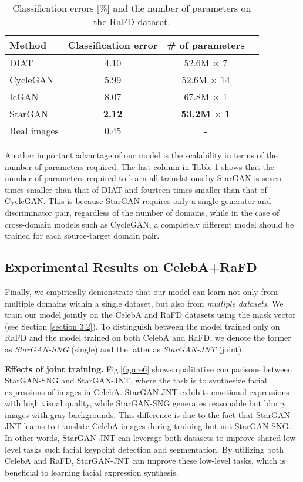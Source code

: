 \documentclass[10pt,twocolumn,letterpaper]{article}
\begin{document}
\begin{table}[ht]
\begin{center}
\begin{tabular}{l c c c}
Method & Classification error & \# of parameters \\
\hline
DIAT & 4.10 & 52.6M $\times$ 7 \\
CycleGAN & 5.99 & 52.6M $\times$ 14\\
IcGAN & 8.07 & 67.8M $\times$ 1\\
StarGAN & \textbf{2.12} & \textbf{53.2M $\times$ 1} \\
\hline
Real images & 0.45 & - \\
\end{tabular}
\end{center}
\caption{Classification errors [\%] and the number of parameters on the RaFD dataset. 
}
\label{table3}
\end{table}

Another important advantage of our model is the scalability in terms of the number of parameters required. The last column in Table \ref{table3} shows that the number of parameters required to learn all translations by StarGAN is seven times smaller than that of DIAT and fourteen times smaller than that of CycleGAN. This is because StarGAN requires only a single generator and discriminator pair, regardless of the number of domains, while in the case of cross-domain models such as CycleGAN, a completely different model should be trained for each source-target domain pair. 



\subsection{Experimental Results on CelebA+RaFD}



Finally, we empirically demonstrate that our model can learn not only from multiple domains within a single dataset, but also from \textit{multiple datasets}. We train our model jointly on the CelebA and RaFD datasets using the mask vector (see Section \ref{section 3.2}). To distinguish between the model trained only on RaFD and the model trained on both CelebA and RaFD, we denote the former as \textit{StarGAN-SNG} (single) and the latter as \textit{StarGAN-JNT} (joint). 

\smallskip

\noindent\textbf{Effects of joint training.} Fig.\thinspace\ref{figure6} shows qualitative comparisons between StarGAN-SNG and StarGAN-JNT, where the task is to synthesize facial expressions of images in CelebA. StarGAN-JNT exhibits emotional expressions with high visual quality, while StarGAN-SNG generates reasonable but blurry images with gray backgrounds. This difference is due to the fact that StarGAN-JNT learns to translate CelebA images during training but not StarGAN-SNG. In other words, StarGAN-JNT can leverage both datasets to improve shared low-level tasks such facial keypoint detection and segmentation. By utilizing both CelebA and RaFD, StarGAN-JNT can improve these low-level tasks, which is beneficial to learning facial expression synthesis. 
\end{document}
